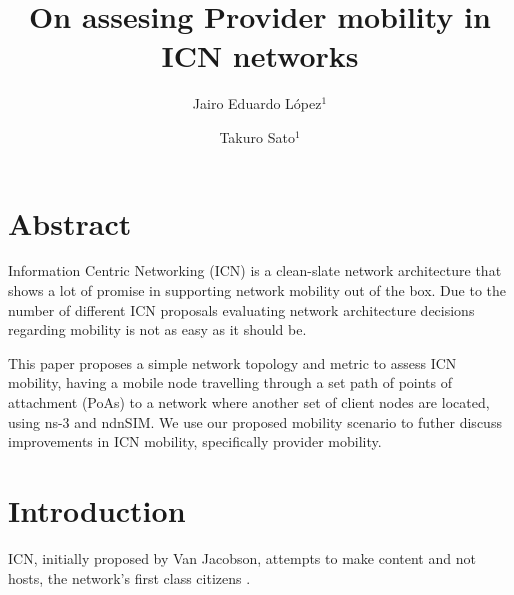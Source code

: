 \documentclass[twocolumn, a4paper]{ieicejsp}
\title{{\bf On assesing Provider mobility in ICN networks}}
\author{
    Jairo Eduardo L\'{o}pez$^1$ \\ \and
    Takuro Sato$^1$ 
}
\begin{document}
\maketitle

\section{Abstract}


Information Centric Networking (ICN) is a clean-slate network architecture that
shows a lot of promise in supporting network mobility out of the box.  Due to
the number of different ICN proposals evaluating network architecture decisions
regarding mobility is not as easy as it should be.

This paper proposes a simple network topology and metric to assess ICN mobility,
having a mobile node travelling through a set path of points of attachment
(PoAs) to a network where another set of client nodes are located, using ns-3
and ndnSIM. We use our proposed mobility scenario to futher discuss improvements
in ICN mobility, specifically provider mobility.

\section{Introduction}
ICN, initially proposed by Van Jacobson, attempts to make content and not hosts,
the network's first class citizens \cite{Jacobson:2009:NNC:1658939.1658941}.
 
\end{document}
